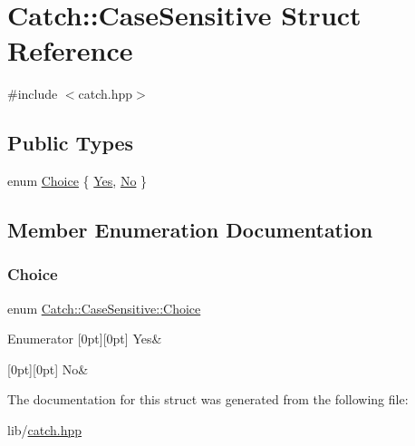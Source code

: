 \hypertarget{struct_catch_1_1_case_sensitive}{}\section{Catch\+:\+:Case\+Sensitive Struct Reference}
\label{struct_catch_1_1_case_sensitive}


{\ttfamily \#include $<$catch.\+hpp$>$}

\subsection*{Public Types}
\begin{DoxyCompactItemize}
\item 
enum \hyperlink{struct_catch_1_1_case_sensitive_aad49d3aee2d97066642fffa919685c6a}{Choice} \{ \hyperlink{struct_catch_1_1_case_sensitive_aad49d3aee2d97066642fffa919685c6aa7c5550b69ec3c502e6f609b67f9613c6}{Yes}, 
\hyperlink{struct_catch_1_1_case_sensitive_aad49d3aee2d97066642fffa919685c6aa4ffff8d29b481f0116abc37228cd53f6}{No}
 \}
\end{DoxyCompactItemize}


\subsection{Member Enumeration Documentation}
\hypertarget{struct_catch_1_1_case_sensitive_aad49d3aee2d97066642fffa919685c6a}{}\label{struct_catch_1_1_case_sensitive_aad49d3aee2d97066642fffa919685c6a} 
\subsubsection{\texorpdfstring{Choice}{Choice}}
{\footnotesize\ttfamily enum \hyperlink{struct_catch_1_1_case_sensitive_aad49d3aee2d97066642fffa919685c6a}{Catch\+::\+Case\+Sensitive\+::\+Choice}}

\begin{DoxyEnumFields}{Enumerator}
[0pt][0pt]{}\hypertarget{struct_catch_1_1_case_sensitive_aad49d3aee2d97066642fffa919685c6aa7c5550b69ec3c502e6f609b67f9613c6}{}\label{struct_catch_1_1_case_sensitive_aad49d3aee2d97066642fffa919685c6aa7c5550b69ec3c502e6f609b67f9613c6} 
Yes&\\
\hline

[0pt][0pt]{}\hypertarget{struct_catch_1_1_case_sensitive_aad49d3aee2d97066642fffa919685c6aa4ffff8d29b481f0116abc37228cd53f6}{}\label{struct_catch_1_1_case_sensitive_aad49d3aee2d97066642fffa919685c6aa4ffff8d29b481f0116abc37228cd53f6} 
No&\\
\hline

\end{DoxyEnumFields}


The documentation for this struct was generated from the following file\+:\begin{DoxyCompactItemize}
\item 
lib/\hyperlink{catch_8hpp}{catch.\+hpp}\end{DoxyCompactItemize}
